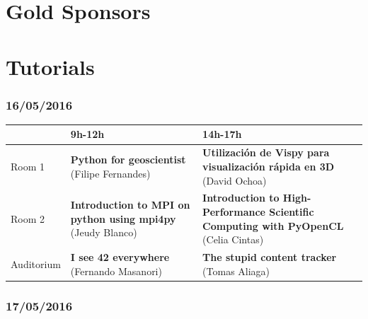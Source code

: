 \documentclass[12pt]{article}
\begin{document}
\newpage

\section*{Gold Sponsors}
\begin{minipage}{0.4\textwidth}

\end{minipage}
\hfill
\begin{minipage}{0.4\textwidth}

\end{minipage}

\vspace*{1cm}

\begin{minipage}{0.4\textwidth}

\end{minipage}
\hfill
\begin{minipage}{0.4\textwidth}

\end{minipage}

\newpage

\section*{Tutorials}

\subsubsection*{16/05/2016}

\begin{center}
   {\footnotesize{%
     \begin{tabular}{@{}l p{5cm} p{5cm}@{}}
     \toprule
      & 9h-12h & 14h-17h\\\midrule
     Room 1 & \textbf{Python for geoscientist} (Filipe Fernandes) & \textbf{Utilización de Vispy para visualización rápida en 3D} (David Ochoa)\\
     Room 2 & \textbf{Introduction to MPI on python using mpi4py} (Jeudy Blanco) & \textbf{Introduction to High-Performance Scientific Computing with PyOpenCL} (Celia Cintas)\\
     Auditorium & \textbf{I see 42 everywhere} (Fernando Masanori) & \textbf{The stupid content tracker} (Tomas Aliaga)\\\bottomrule
   \end{tabular}
 }}
\end{center}

\subsubsection*{17/05/2016}
\end{document}
